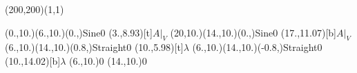 \unitlength=1bp%

\begin{feynartspicture}(200,200)(1,1)

\FADiagram{}
\FAProp(0.,10.)(6.,10.)(0.,){Sine}{0}
\FALabel(3.,8.93)[t]{$A|_V$}
\FAProp(20,10.)(14.,10.)(0.,){Sine}{0}
\FALabel(17.,11.07)[b]{$A|_V$}
\FAProp(6.,10.)(14.,10.)(0.8,){Straight}{0}
\FALabel(10.,5.98)[t]{$\lambda$}
\FAProp(6.,10.)(14.,10.)(-0.8,){Straight}{0}
\FALabel(10.,14.02)[b]{$\lambda$}
\FAVert(6.,10.){0}
\FAVert(14.,10.){0}
\end{feynartspicture}

